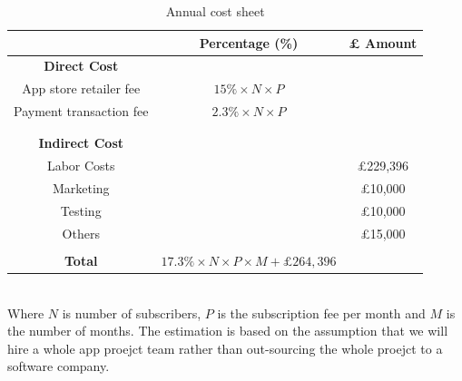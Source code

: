 \begin{table}[ht]
\centering
\begin{tabular}{ |c|c|c|} 
 \hline
 &\textbf{Percentage (\%)} &\textbf{ £ Amount }\\
 \hline
\multicolumn{1}{|c}{\textbf{Direct Cost}} &\multicolumn{1}{c}{}&\\
 \hline
 App store retailer fee&$15\%\times N \times P$&\\
 \hline
 Payment transaction fee&$2.3\% \times N \times P$&\\
 \hline
 &&\\
 \hline
 \multicolumn{1}{|c}{}&\multicolumn{1}{c}{}&\\\hline
 \multicolumn{1}{|c}{\textbf{Indirect Cost}} &\multicolumn{1}{c}{}&\\
 \hline
 Labor Costs&&£229,396\\
 \hline
 Marketing&&£10,000\\
 \hline
 Testing&&£10,000\\
 \hline
 Others&&£15,000\\
 \hline
 \multicolumn{1}{|c}{}&\multicolumn{1}{c}{}&\\
 \hline
 \textbf{Total}&\multicolumn{1}{c}{$17.3\%\times N \times P \times M + £264,396$}&\\
 \hline
 \end{tabular}
 \caption{Annual cost sheet}
 \end{table}
\\Where $N$ is number of subscribers, $P$ is the subscription fee per month and $M$ is the number of months. The estimation is based on the assumption that we will hire a whole app proejct team rather than out-sourcing the whole proejct to a software company.

